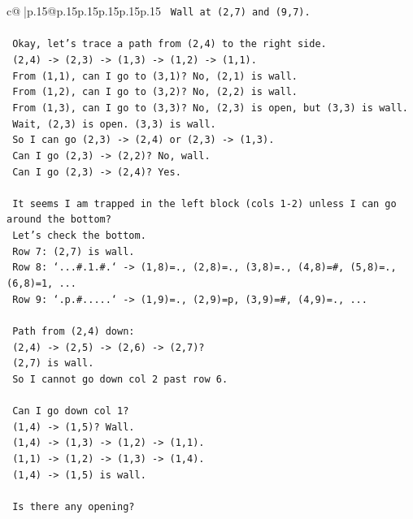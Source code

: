 \documentclass{article}
\begin{document}
{\begin{supertabular}{c@{$\;$}|p{.15\linewidth}@{}p{.15\linewidth}p{.15\linewidth}p{.15\linewidth}p{.15\linewidth}p{.15\linewidth}}
{{{\texttt{   Wall at (2,7) and (9,7).} \\
\\ 
\texttt{   Okay, let's trace a path from (2,4) to the right side.} \\
\texttt{   (2,4) {-}> (2,3) {-}> (1,3) {-}> (1,2) {-}> (1,1).} \\
\texttt{   From (1,1), can I go to (3,1)? No, (2,1) is wall.} \\
\texttt{   From (1,2), can I go to (3,2)? No, (2,2) is wall.} \\
\texttt{   From (1,3), can I go to (3,3)? No, (2,3) is open, but (3,3) is wall.} \\
\texttt{   Wait, (2,3) is open. (3,3) is wall.} \\
\texttt{   So I can go (2,3) {-}> (2,4) or (2,3) {-}> (1,3).} \\
\texttt{   Can I go (2,3) {-}> (2,2)? No, wall.} \\
\texttt{   Can I go (2,3) {-}> (2,4)? Yes.} \\
\\ 
\texttt{   It seems I am trapped in the left block (cols 1{-}2) unless I can go around the bottom?} \\
\texttt{   Let's check the bottom.} \\
\texttt{   Row 7: (2,7) is wall.} \\
\texttt{   Row 8: `...\#.1.\#.` {-}> (1,8)=., (2,8)=., (3,8)=., (4,8)=\#, (5,8)=., (6,8)=1, ...} \\
\texttt{   Row 9: `.p.\#.....` {-}> (1,9)=., (2,9)=p, (3,9)=\#, (4,9)=., ...} \\
\\ 
\texttt{   Path from (2,4) down:} \\
\texttt{   (2,4) {-}> (2,5) {-}> (2,6) {-}> (2,7)?} \\
\texttt{   (2,7) is wall.} \\
\texttt{   So I cannot go down col 2 past row 6.} \\
\\ 
\texttt{   Can I go down col 1?} \\
\texttt{   (1,4) {-}> (1,5)? Wall.} \\
\texttt{   (1,4) {-}> (1,3) {-}> (1,2) {-}> (1,1).} \\
\texttt{   (1,1) {-}> (1,2) {-}> (1,3) {-}> (1,4).} \\
\texttt{   (1,4) {-}> (1,5) is wall.} \\
\\ 
\texttt{   Is there any opening?} \\
}}}
\end{supertabular}}
\end{document}
